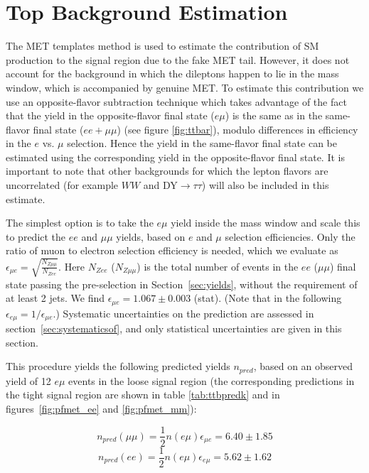 


\section{Top Background Estimation}
\label{sec:topbkg}


The MET templates method is used to estimate the contribution of SM \Z production
 to the signal region due to the fake MET tail. However,
it does not account for the \ttbar background in which the dileptons happen to lie
 in the \Z mass window, which is accompanied by genuine MET. 
To estimate this contribution we use an opposite-flavor subtraction
technique which takes advantage of the fact that the \ttbar yield in the 
opposite-flavor final state ($e\mu$) is the same as in the same-flavor final state
($ee+\mu\mu$) (see figure \ref{fig:ttbar}), 
modulo differences in efficiency in the $e$ vs. $\mu$ selection.
 Hence the \ttbar yield in the same-flavor final state can be estimated
using the corresponding yield in the opposite-flavor final state. 
It is important to note that other backgrounds for which the lepton flavors are
uncorrelated (for example $WW$ and DY$\rightarrow \tau\tau$) will also be included in
this estimate.

The simplest option
 is to take the $e\mu$ yield inside the \Z mass window and scale this
to predict the $ee$ and $\mu\mu$ yields, based on $e$ and $\mu$ selection efficiencies.
Only the ratio of muon to electron selection efficiency is needed, which we evaluate
 as $\epsilon_{\mu e} = \sqrt{\frac{N_{Z\mu\mu}}{N_{Zee}}}$. 
Here $N_{Zee}$ ($N_{Z\mu\mu}$) is the total number of events in the $ee$ ($\mu\mu$)
 final state passing the pre-selection in Section~\ref{sec:yields},
without the requirement of at least 2 jets. We find
 $\epsilon_{\mu e}=1.067 \pm 0.003$ (stat). %
(Note that in the following $\epsilon_{e\mu} = 1/\epsilon_{\mu e}$.)
Systematic uncertainties on the prediction are assessed in section~\ref{sec:systematicsof}, 
and only statistical uncertainties are given in this section.

This procedure yields the following predicted yields $n_{pred}$,
based on an observed yield of 12 $e\mu$ events %
in the loose signal region 
(the corresponding predictions in the tight 
signal region are shown in table \ref{tab:ttbpredk}
and in figures~\ref{fig:pfmet_ee} and \ref{fig:pfmet_mm}): 

\begin{equation}
n_{pred}(\mu\mu) = \frac{1}{2}n(e\mu)\epsilon_{\mu e} = 6.40 \pm 1.85 %
\end{equation}
\begin{equation}
n_{pred}(ee)     = \frac{1}{2}n(e\mu)\epsilon_{e\mu} = 5.62 \pm 1.62
\end{equation}

